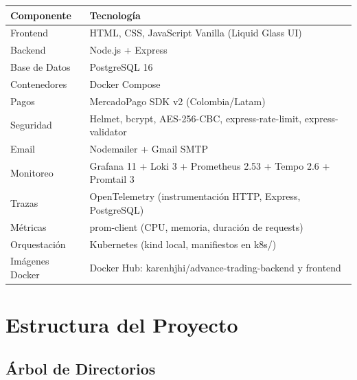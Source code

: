 \documentclass[12pt,oneside]{article}
\begin{document}
\begin{table}[H]
\centering
\begin{tabularx}{\textwidth}{l X}
\toprule
\textbf{Componente} & \textbf{Tecnología} \\
\midrule
Frontend & HTML, CSS, JavaScript Vanilla (Liquid Glass UI) \\
Backend & Node.js + Express \\
Base de Datos & PostgreSQL 16 \\
Contenedores & Docker Compose \\
Pagos & MercadoPago SDK v2 (Colombia/Latam) \\
Seguridad & Helmet, bcrypt, AES-256-CBC, express-rate-limit, express-validator \\
Email & Nodemailer + Gmail SMTP \\
Monitoreo & Grafana 11 + Loki 3 + Prometheus 2.53 + Tempo 2.6 + Promtail 3 \\
Trazas & OpenTelemetry (instrumentación HTTP, Express, PostgreSQL) \\
Métricas & prom-client (CPU, memoria, duración de requests) \\
Orquestación & Kubernetes (kind local, manifiestos en k8s/) \\
Imágenes Docker & Docker Hub: karenhjhi/advance-trading-backend y frontend \\
\bottomrule
\end{tabularx}
\end{table}

\section{Estructura del Proyecto}

\subsection{Árbol de Directorios}
\end{document}
